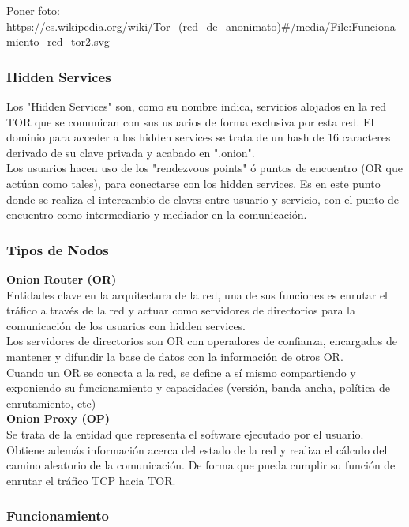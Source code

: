 Poner foto: https://es.wikipedia.org/wiki/Tor_(red_de_anonimato)#/media/File:Funcionamiento_red_tor2.svg

\subsubsection {Hidden Services}

Los "Hidden Services" son, como su nombre indica, servicios alojados en la red TOR que se comunican con sus usuarios de forma exclusiva por esta red. El dominio para acceder a los hidden services se trata de un hash de 16 caracteres derivado de su clave privada y acabado en ".onion". \\

Los usuarios hacen uso de los "rendezvous points" ó puntos de encuentro (OR que actúan como tales), para conectarse con los hidden services. Es en este punto donde se realiza el intercambio de claves entre usuario y servicio, con el punto de encuentro como intermediario y mediador en la comunicación. \\ 


\subsubsection {Tipos de Nodos}

\textbf {Onion Router (OR)} \\
Entidades clave en la arquitectura de la red, una de sus funciones es enrutar el tráfico a través de la red y actuar como servidores de directorios para la comunicación de los usuarios con hidden services. \\ Los servidores de directorios son OR con operadores de confianza, encargados de mantener y difundir la base de datos con la información de otros OR. \\

Cuando un OR se conecta a la red, se define a sí mismo compartiendo y exponiendo su funcionamiento y capacidades (versión, banda ancha, política de enrutamiento, etc) \\

\textbf {Onion Proxy (OP)} \\
Se trata de la entidad que representa el software ejecutado por el usuario. Obtiene además información acerca del estado de la red y realiza el cálculo del camino aleatorio de la comunicación. De forma que pueda cumplir su función de enrutar el tráfico TCP hacia TOR.

\subsubsection {Funcionamiento}

